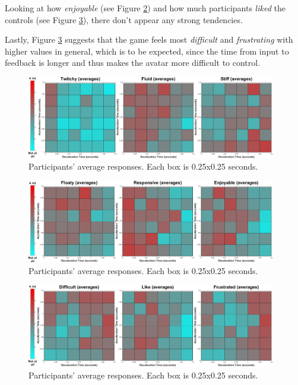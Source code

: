 Looking at how \textit{enjoyable} (see Figure \ref{fig:floaty_responsive_enjoyable_avg}) and how much participants \textit{liked} the controls (see Figure \ref{fig:difficult_like_frustration_avg}), there don't appear any strong tendencies.

Lastly, Figure \ref{fig:difficult_like_frustration_avg} suggests that the game feels most \textit{difficult} and \textit{frustrating} with higher values in general, which is to be expected, since the time from input to feedback is longer and thus makes the avatar more difficult to control.

\begin{figure}[!htb]
\centering
\includegraphics[width=0.97\textwidth]{Pics/Classes/averages/twitchy_fluid_stiff_avg}
\caption{Participants' average responses. Each box is 0.25x0.25 seconds.}
\label{fig:twitchy_fluid_stiff_avg}
\end{figure}

\begin{figure}[!htb]
\centering
\includegraphics[width=0.97\textwidth]{Pics/Classes/averages/floaty_responsive_enjoyable_avg.png}
\caption{Participants' average responses. Each box is 0.25x0.25 seconds.}
\label{fig:floaty_responsive_enjoyable_avg}
\end{figure}

\begin{figure}[!htb]
\centering
\includegraphics[width=0.97\textwidth]{Pics/Classes/averages/difficult_like_frustration_avg}
\caption{Participants' average responses. Each box is 0.25x0.25 seconds.}
\label{fig:difficult_like_frustration_avg}
\end{figure}

